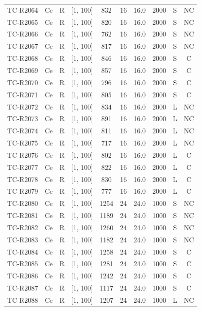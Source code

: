 \begin{longtable}{lccccccccc}
TC-R2064 & Ce & R & [1, 100] & 832 & 16 & 16.0 & 2000 & S & NC \\
TC-R2065 & Ce & R & [1, 100] & 820 & 16 & 16.0 & 2000 & S & NC \\
TC-R2066 & Ce & R & [1, 100] & 762 & 16 & 16.0 & 2000 & S & NC \\
TC-R2067 & Ce & R & [1, 100] & 817 & 16 & 16.0 & 2000 & S & NC \\
TC-R2068 & Ce & R & [1, 100] & 846 & 16 & 16.0 & 2000 & S & C \\
TC-R2069 & Ce & R & [1, 100] & 857 & 16 & 16.0 & 2000 & S & C \\
TC-R2070 & Ce & R & [1, 100] & 796 & 16 & 16.0 & 2000 & S & C \\
TC-R2071 & Ce & R & [1, 100] & 805 & 16 & 16.0 & 2000 & S & C \\
TC-R2072 & Ce & R & [1, 100] & 834 & 16 & 16.0 & 2000 & L & NC \\
TC-R2073 & Ce & R & [1, 100] & 891 & 16 & 16.0 & 2000 & L & NC \\
TC-R2074 & Ce & R & [1, 100] & 811 & 16 & 16.0 & 2000 & L & NC \\
TC-R2075 & Ce & R & [1, 100] & 717 & 16 & 16.0 & 2000 & L & NC \\
TC-R2076 & Ce & R & [1, 100] & 802 & 16 & 16.0 & 2000 & L & C \\
TC-R2077 & Ce & R & [1, 100] & 822 & 16 & 16.0 & 2000 & L & C \\
TC-R2078 & Ce & R & [1, 100] & 830 & 16 & 16.0 & 2000 & L & C \\
TC-R2079 & Ce & R & [1, 100] & 777 & 16 & 16.0 & 2000 & L & C \\
TC-R2080 & Ce & R & [1, 100] & 1254 & 24 & 24.0 & 1000 & S & NC \\
TC-R2081 & Ce & R & [1, 100] & 1189 & 24 & 24.0 & 1000 & S & NC \\
TC-R2082 & Ce & R & [1, 100] & 1260 & 24 & 24.0 & 1000 & S & NC \\
TC-R2083 & Ce & R & [1, 100] & 1182 & 24 & 24.0 & 1000 & S & NC \\
TC-R2084 & Ce & R & [1, 100] & 1258 & 24 & 24.0 & 1000 & S & C \\
TC-R2085 & Ce & R & [1, 100] & 1281 & 24 & 24.0 & 1000 & S & C \\
TC-R2086 & Ce & R & [1, 100] & 1242 & 24 & 24.0 & 1000 & S & C \\
TC-R2087 & Ce & R & [1, 100] & 1117 & 24 & 24.0 & 1000 & S & C \\
TC-R2088 & Ce & R & [1, 100] & 1207 & 24 & 24.0 & 1000 & L & NC \\

\end{longtable}
